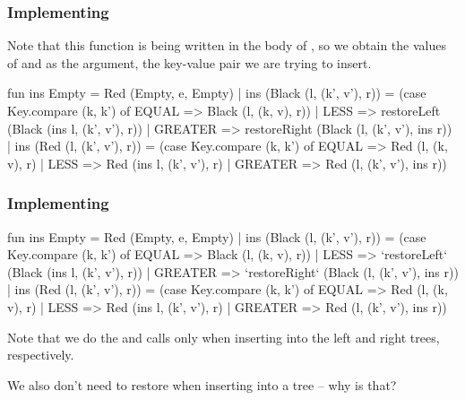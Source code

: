 \documentclass[aspectratio=169]{beamer}
\begin{document}
\begin{frame}[fragile]
  \frametitle{Implementing }

  Note that this function is being written in the body of , so
  we obtain the values of  and  as the argument, the
  key-value pair we are trying to insert.

  \pause
  \vspace{\fill}

  \begin{codeblock}
    fun ins Empty = Red (Empty, e, Empty)
      | ins (Black (l, (k', v'), r)) =
          (case Key.compare (k, k') of
            EQUAL   => Black (l, (k, v), r))
          | LESS    => restoreLeft (Black (ins l, (k', v'), r))
          | GREATER => restoreRight (Black (l, (k', v'), ins r))
      | ins (Red (l, (k', v'), r)) =
          (case Key.compare (k, k') of
            EQUAL   => Red (l, (k, v), r)
          | LESS    => Red (ins l, (k', v'), r)
          | GREATER => Red (l, (k', v'), ins r))
  \end{codeblock}
\end{frame}

\begin{frame}[fragile]
  \frametitle{Implementing }

  {\small
  \begin{codeblock}
    fun ins Empty = Red (Empty, e, Empty)
      | ins (Black (l, (k', v'), r)) =
          (case Key.compare (k, k') of
            EQUAL   => Black (l, (k, v), r))
          | LESS    => `restoreLeft` (Black (ins l, (k', v'), r))
          | GREATER => `restoreRight` (Black (l, (k', v'), ins r))
      | ins (Red (l, (k', v'), r)) =
          (case Key.compare (k, k') of
            EQUAL   => Red (l, (k, v), r)
          | LESS    => Red (ins l, (k', v'), r)
          | GREATER => Red (l, (k', v'), ins r))
  \end{codeblock}
  }

  \pause
  \vspace{\fill}

  Note that we do the  and  calls only
  when inserting into the left and right trees, respectively.

  \pause
  \vspace{\fill}

  We also don't need to restore when inserting into a  tree --
  why is that?

\end{frame}
\end{document}
